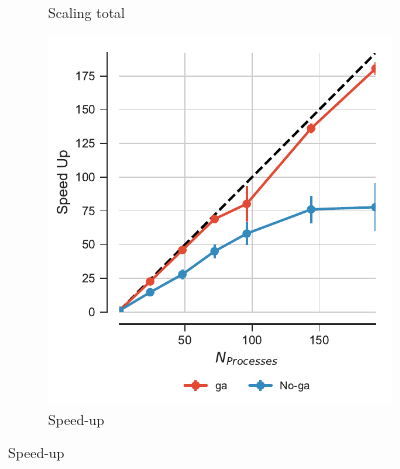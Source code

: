 \begin{figure}[ht!]
\begin{subfigure}{.3\textwidth}
  \caption{Scaling total}
  \label{fig:MPIscaling-split}
\end{subfigure}
\hfill
\begin{subfigure}{.3\textwidth}
  \includegraphics[width=\linewidth]{figures/Comparison_Speed_UP_traj_splitting.pdf}
  \captionsetup{format=hang}
  \caption{Speed-up}
  \label{fig:MPIspeedup-split}
\end{subfigure}
\bigskip


\end{figure}
